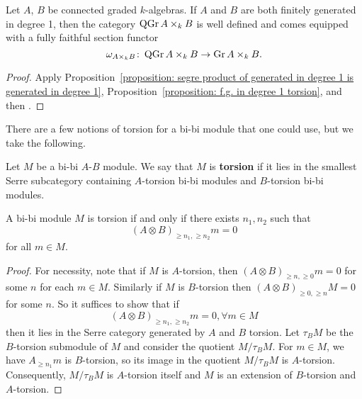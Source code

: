 \begin{corollary}
  Let \(A\), \(B\) be connected graded \(k\)-algebras.
  If \(A\) and \(B\) are both finitely generated in degree 1, then the category \(\operatorname{QGr}A \times_k B\) is well defined and comes equipped with a fully faithful section functor
  \[\omega_{A \times_k B} \colon \operatorname{QGr}A \times_k B \to \operatorname{Gr}A \times_k B.\]
\end{corollary}

\begin{proof}
  Apply Proposition~\ref{proposition: segre product of generated in degree 1 is generated in degree 1}, Proposition~\ref{proposition: f.g. in degree 1 torsion}, and then \parencite[Cor. 1, III.3]{DCA62}.
\end{proof}

There are a few notions of torsion for a bi-bi module that one could use, but we take the following.

\begin{definition}
  Let \(M\) be a bi-bi \(A\)-\(B\) module. We say that \(M\) is \textbf{torsion} if it lies in the smallest Serre subcategory containing \(A\)-torsion bi-bi modules and \(B\)-torsion bi-bi modules.
\end{definition}

\begin{lemma} \label{lemma: alternate char of bibi torsion}
  A bi-bi module \(M\) is torsion if and only if there exists \(n_1,n_2\) such that 
  \begin{displaymath}
    (A \otimes B)_{\geq n_1, \geq n_2} m = 0
  \end{displaymath}
  for all \(m \in M\).
\end{lemma}

\begin{proof}
  For necessity, note that if \(M\) is \(A\)-torsion, then \((A \otimes B)_{\geq n, \geq 0} m = 0\) for some \(n\) for each \(m \in M\).
  Similarly if \(M\) is \(B\)-torsion then \((A \otimes B)_{\geq 0,\geq n} M = 0\) for some \(n\).
  So it suffices to show that if
  \begin{displaymath}
    (A \otimes B)_{\geq n_1, \geq n_2} m = 0 , \forall m \in M
  \end{displaymath}
  then it lies in the Serre category generated by \(A\) and \(B\) torsion. Let \(\tau_B M\) be the \(B\)-torsion submodule of \(M\) and consider the quotient \(M/\tau_B M\). For \(m \in M\), we have \(A_{\geq n_1}m\) is \(B\)-torsion, so its image in the quotient \(M/\tau_B M\) is \(A\)-torsion. Consequently, \(M / \tau_B M\) is \(A\)-torsion itself and \(M\) is an extension of \(B\)-torsion and \(A\)-torsion. 
\end{proof}

